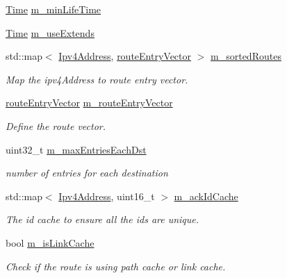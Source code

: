 \begin{DoxyCompactItemize}
\item 
\hyperlink{classns3_1_1Time}{Time} \hyperlink{classns3_1_1dsr_1_1DsrRouteCache_ab1fe273b756ac95e21cf000728e33d12}{m\+\_\+min\+Life\+Time}
\item 
\hyperlink{classns3_1_1Time}{Time} \hyperlink{classns3_1_1dsr_1_1DsrRouteCache_aaa148075ecbecd459f1de62d7e43146a}{m\+\_\+use\+Extends}
\item 
std\+::map$<$ \hyperlink{classns3_1_1Ipv4Address}{Ipv4\+Address}, \hyperlink{classns3_1_1dsr_1_1DsrRouteCache_a21c35649779d4e4c85b8e128dbcc0971}{route\+Entry\+Vector} $>$ \hyperlink{classns3_1_1dsr_1_1DsrRouteCache_a8d3530713c7152dbe42d0b616d9c1d96}{m\+\_\+sorted\+Routes}
\begin{DoxyCompactList}\small\item\em Map the ipv4\+Address to route entry vector. \end{DoxyCompactList}\item 
\hyperlink{classns3_1_1dsr_1_1DsrRouteCache_a21c35649779d4e4c85b8e128dbcc0971}{route\+Entry\+Vector} \hyperlink{classns3_1_1dsr_1_1DsrRouteCache_a28e5d3670fcebc5a5b3b437f5e8be34a}{m\+\_\+route\+Entry\+Vector}
\begin{DoxyCompactList}\small\item\em Define the route vector. \end{DoxyCompactList}\item 
uint32\+\_\+t \hyperlink{classns3_1_1dsr_1_1DsrRouteCache_aa6b2bd241ac25da54f0ee83d6a9946be}{m\+\_\+max\+Entries\+Each\+Dst}
\begin{DoxyCompactList}\small\item\em number of entries for each destination \end{DoxyCompactList}\item 
std\+::map$<$ \hyperlink{classns3_1_1Ipv4Address}{Ipv4\+Address}, uint16\+\_\+t $>$ \hyperlink{classns3_1_1dsr_1_1DsrRouteCache_a5f4c097ed11c2c1447699214bc4be0e0}{m\+\_\+ack\+Id\+Cache}
\begin{DoxyCompactList}\small\item\em The id cache to ensure all the ids are unique. \end{DoxyCompactList}\item 
bool \hyperlink{classns3_1_1dsr_1_1DsrRouteCache_aa30aef1d07ad115a3697a5ddaaaa755a}{m\+\_\+is\+Link\+Cache}
\begin{DoxyCompactList}\small\item\em Check if the route is using path cache or link cache. \end{DoxyCompactList}\item 

\end{DoxyCompactItemize}

